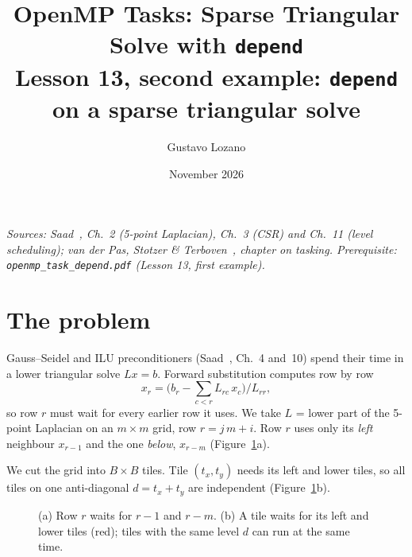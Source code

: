 \documentclass[11pt,a4paper]{article}
\title{\textbf{OpenMP Tasks: Sparse Triangular Solve with \texttt{depend}}\\[4pt]\large Lesson 13, second example: \texttt{depend} on a sparse triangular solve}
\author{Gustavo Lozano}
\date{November 2026}
\let\origtexttt\texttt
\renewcommand{\texttt}[1]{\textcolor{black!60}{\origtexttt{#1}}}
\begin{document}
\maketitle

\noindent\textit{\small Sources: Saad~\cite{saad}, Ch.~2 (5-point Laplacian), Ch.~3 (CSR) and
Ch.~11 (level scheduling); van der Pas, Stotzer \& Terboven~\cite{vdp}, chapter on tasking.
Prerequisite: \texttt{openmp\_task\_depend.pdf} (Lesson 13, first example).}

\section{The problem}
Gauss--Seidel and ILU preconditioners (Saad~\cite{saad}, Ch.~4 and~10) spend their time in a
lower triangular solve $Lx=b$. Forward substitution computes row by row
\[
x_r = \Big(b_r - \sum_{c<r} L_{rc}\,x_c\Big) \Big/ L_{rr},
\]
so row $r$ must wait for every earlier row it uses. We take $L$ = lower part of the 5-point
Laplacian on an $m\times m$ grid, row $r = j\,m + i$. Row $r$ uses only its \emph{left}
neighbour $x_{r-1}$ and the one \emph{below}, $x_{r-m}$ (Figure~\ref{fig:grid}a).

We cut the grid into $B\times B$ tiles. Tile $(t_x,t_y)$ needs its left and lower tiles, so
all tiles on one anti-diagonal $d = t_x + t_y$ are independent (Figure~\ref{fig:grid}b).

\begin{figure}[H]
\centering
{}
\caption{(a) Row $r$ waits for $r-1$ and $r-m$. (b) A tile waits for its left and lower tiles
(red); tiles with the same level $d$ can run at the same time.}
\label{fig:grid}
\end{figure}
\end{document}
